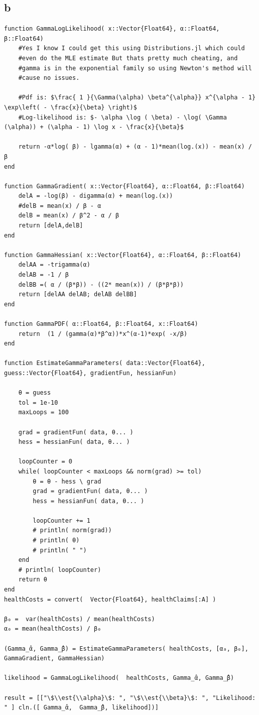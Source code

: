 \documentclass[12pt, letterpaper]{paper}
\begin{document}
\subsection{b}
\label{sec:org4493d65}
\begin{verbatim}
function GammaLogLikelihood( x::Vector{Float64}, α::Float64, β::Float64)
    #Yes I know I could get this using Distributions.jl which could
    #even do the MLE estimate But thats pretty much cheating, and
    #gamma is in the exponential family so using Newton's method will
    #cause no issues.

    #Pdf is: $\frac{ 1 }{\Gamma(\alpha) \beta^{\alpha}} x^{\alpha - 1} \exp\left( - \frac{x}{\beta} \right)$
    #Log-likelihood is: $- \alpha \log ( \beta) - \log( \Gamma (\alpha)) + (\alpha - 1) \log x - \frac{x}{\beta}$

    return -α*log( β) - lgamma(α) + (α - 1)*mean(log.(x)) - mean(x) / β
end

function GammaGradient( x::Vector{Float64}, α::Float64, β::Float64)
    delA = -log(β) - digamma(α) + mean(log.(x))
    #delB = mean(x) / β - α
    delB = mean(x) / β^2 - α / β
    return [delA,delB]
end

function GammaHessian( x::Vector{Float64}, α::Float64, β::Float64)
    delAA = -trigamma(α)
    delAB = -1 / β
    delBB =( α / (β*β)) - ((2* mean(x)) / (β*β*β))
    return [delAA delAB; delAB delBB]
end

function GammaPDF( α::Float64, β::Float64, x::Float64)
    return  (1 / (gamma(α)*β^α))*x^(α-1)*exp( -x/β)
end

function EstimateGammaParameters( data::Vector{Float64}, guess::Vector{Float64}, gradientFun, hessianFun)

    θ = guess
    tol = 1e-10
    maxLoops = 100

    grad = gradientFun( data, θ... )
    hess = hessianFun( data, θ... )

    loopCounter = 0
    while( loopCounter < maxLoops && norm(grad) >= tol)
        θ = θ - hess \ grad
        grad = gradientFun( data, θ... )
        hess = hessianFun( data, θ... )

        loopCounter += 1
        # println( norm(grad))
        # println( θ)
        # println( " ")
    end
    # println( loopCounter)
    return θ
end
healthCosts = convert(  Vector{Float64}, healthClaims[:A] )

β₀ =  var(healthCosts) / mean(healthCosts)
α₀ = mean(healthCosts) / β₀

(Gamma_̂α, Gamma_̂β) = EstimateGammaParameters( healthCosts, [α₀, β₀], GammaGradient, GammaHessian)

likelihood = GammaLogLikelihood(  healthCosts, Gamma_̂α, Gamma_̂β)

result = [["\$\\est{\\alpha}\$: ", "\$\\est{\\beta}\$: ", "Likelihood: " ] cln.([ Gamma_̂α,  Gamma_̂β, likelihood])]
\end{verbatim}
\end{document}
